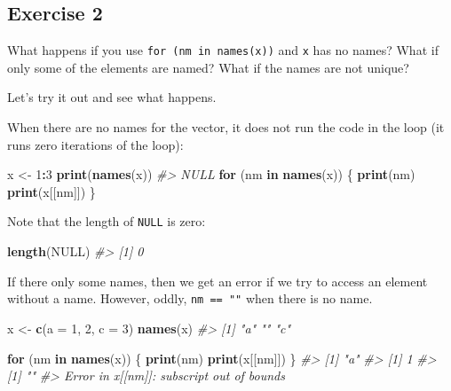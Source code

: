 \documentclass[]{book}
\newenvironment{Shaded}{\begin{snugshade}}{\end{snugshade}}
\newcommand{\CommentTok}[1]{\textcolor[rgb]{0.56,0.35,0.01}{\textit{#1}}}
\newcommand{\ControlFlowTok}[1]{\textcolor[rgb]{0.13,0.29,0.53}{\textbf{#1}}}
\newcommand{\DataTypeTok}[1]{\textcolor[rgb]{0.13,0.29,0.53}{#1}}
\newcommand{\DecValTok}[1]{\textcolor[rgb]{0.00,0.00,0.81}{#1}}
\newcommand{\KeywordTok}[1]{\textcolor[rgb]{0.13,0.29,0.53}{\textbf{#1}}}
\newcommand{\NormalTok}[1]{#1}
\newcommand{\OperatorTok}[1]{\textcolor[rgb]{0.81,0.36,0.00}{\textbf{#1}}}
\newcommand{\OtherTok}[1]{\textcolor[rgb]{0.56,0.35,0.01}{#1}}
\newcommand{\StringTok}[1]{\textcolor[rgb]{0.31,0.60,0.02}{#1}}
\theoremstyle{definition}
\theoremstyle{definition}
\theoremstyle{definition}
\theoremstyle{remark}
\begin{document}
\hypertarget{exercise-2-52}{%
\subsection{Exercise 2}\label{exercise-2-52}}

What happens if you use \texttt{for\ (nm\ in\ names(x))} and \texttt{x}
has no names? What if only some of the elements are named? What if the
names are not unique?

Let's try it out and see what happens.

When there are no names for the vector, it does not run the code in the
loop (it runs zero iterations of the loop):

\begin{Shaded}
\begin{Highlighting}[]
\NormalTok{x <-}\StringTok{ }\DecValTok{1}\OperatorTok{:}\DecValTok{3}
\KeywordTok{print}\NormalTok{(}\KeywordTok{names}\NormalTok{(x))}
\CommentTok{#> NULL}
\ControlFlowTok{for}\NormalTok{ (nm }\ControlFlowTok{in} \KeywordTok{names}\NormalTok{(x)) \{}
  \KeywordTok{print}\NormalTok{(nm)}
  \KeywordTok{print}\NormalTok{(x[[nm]])}
\NormalTok{\}}
\end{Highlighting}
\end{Shaded}

Note that the length of \texttt{NULL} is zero:

\begin{Shaded}
\begin{Highlighting}[]
\KeywordTok{length}\NormalTok{(}\OtherTok{NULL}\NormalTok{)}
\CommentTok{#> [1] 0}
\end{Highlighting}
\end{Shaded}

If there only some names, then we get an error if we try to access an
element without a name. However, oddly, \texttt{nm\ ==\ ""} when there
is no name.

\begin{Shaded}
\begin{Highlighting}[]
\NormalTok{x <-}\StringTok{ }\KeywordTok{c}\NormalTok{(}\DataTypeTok{a =} \DecValTok{1}\NormalTok{, }\DecValTok{2}\NormalTok{, }\DataTypeTok{c =} \DecValTok{3}\NormalTok{)}
\KeywordTok{names}\NormalTok{(x)}
\CommentTok{#> [1] "a" ""  "c"}
\end{Highlighting}
\end{Shaded}

\begin{Shaded}
\begin{Highlighting}[]
\ControlFlowTok{for}\NormalTok{ (nm }\ControlFlowTok{in} \KeywordTok{names}\NormalTok{(x)) \{}
  \KeywordTok{print}\NormalTok{(nm)}
  \KeywordTok{print}\NormalTok{(x[[nm]])}
\NormalTok{\}}
\CommentTok{#> [1] "a"}
\CommentTok{#> [1] 1}
\CommentTok{#> [1] ""}
\CommentTok{#> Error in x[[nm]]: subscript out of bounds}
\end{Highlighting}
\end{Shaded}
\end{document}
